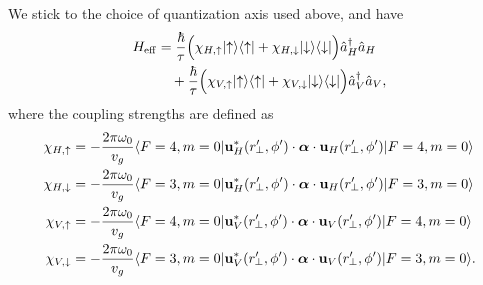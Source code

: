 \documentclass[preprint,aps,pra,onecolumn]{revtex4-1} %
\renewcommand{\tensor}[1]{\boldsymbol{#1}}
\begin{document}
We stick to the choice of quantization axis used above, and have
\begin{align}
H_{\rm eff} & = \frac{ \hbar }{ \tau}\Big( \chi_{H,\uparrow}\lvert{\uparrow}\rangle\langle{\uparrow}\rvert +  
\chi_{H,\downarrow} \lvert{\downarrow}\rangle\langle{\downarrow}\rvert \Big) \hat{a}_H^\dagger \hat{a}_H \nonumber\\
&\quad +  \frac{ \hbar }{ \tau} \Big( \chi_{V,\uparrow}\lvert{\uparrow}\rangle\langle{\uparrow}\rvert +  \chi_{V,\downarrow} 
\lvert{\downarrow}\rangle\langle{\downarrow}\rvert \Big) \hat{a}_V^\dagger \hat{a}_V  ,
\end{align}
where the coupling strengths are defined as
\begin{align}
\chi_{H,\uparrow} &=  -\frac{2\pi\omega_0}{v_g} \bra{F=4,m=0} 
\mathbf{u}^*_{H}(r^\prime\!\!_\perp,\phi') \cdot\tensor{\alpha}\cdot 
\mathbf{u}_{H}(r^\prime\!\!_\perp,\phi') \ket{F=4,m=0}\\
\chi_{H,\downarrow} &=  -\frac{2\pi\omega_0}{v_g}  \bra{F=3,m=0} 
\mathbf{u}^*_{H}(r^\prime\!\!_\perp,\phi') \cdot\tensor{\alpha}\cdot 
\mathbf{u}_{H}(r^\prime\!\!_\perp,\phi') \ket{F=3,m=0} \\
\chi_{V,\uparrow} &=  -\frac{2\pi\omega_0}{v_g}   \bra{F=4,m=0} 
\mathbf{u}^*_{V}(r^\prime\!\!_\perp,\phi') \cdot\tensor{\alpha}\cdot 
\mathbf{u}_{V}(r^\prime\!\!_\perp,\phi') \ket{F=4,m=0}  \\
\chi_{V,\downarrow} &=  -\frac{2\pi\omega_0}{v_g}  \bra{F=3,m=0} 
\mathbf{u}^*_{V}(r^\prime\!\!_\perp,\phi') \cdot\tensor{\alpha}\cdot 
\mathbf{u}_{V}(r^\prime\!\!_\perp,\phi') \ket{F=3,m=0}. 
\end{align}
\end{document}
